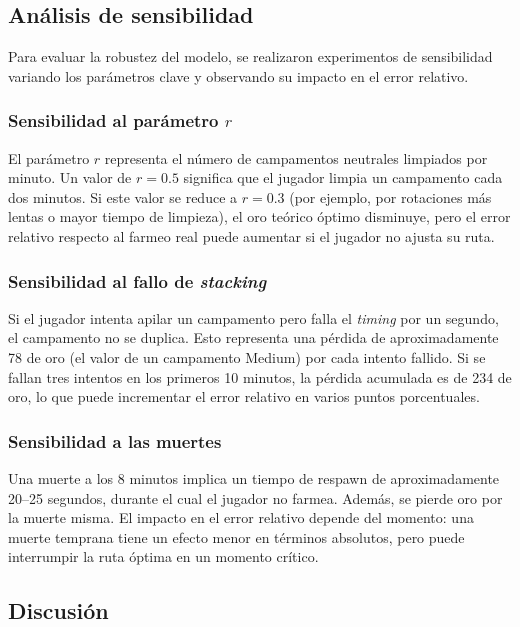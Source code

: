 \subsection{Análisis de sensibilidad}

Para evaluar la robustez del modelo, se realizaron experimentos de sensibilidad variando los parámetros clave y observando su impacto en el error relativo.

\subsubsection{Sensibilidad al parámetro \(r\)}

El parámetro \(r\) representa el número de campamentos neutrales limpiados por minuto. Un valor de \(r = 0.5\) significa que el jugador limpia un campamento cada dos minutos. Si este valor se reduce a \(r = 0.3\) (por ejemplo, por rotaciones más lentas o mayor tiempo de limpieza), el oro teórico óptimo disminuye, pero el error relativo respecto al farmeo real puede aumentar si el jugador no ajusta su ruta.

\subsubsection{Sensibilidad al fallo de \textit{stacking}}

Si el jugador intenta apilar un campamento pero falla el \textit{timing} por un segundo, el campamento no se duplica. Esto representa una pérdida de aproximadamente 78 de oro (el valor de un campamento Medium) por cada intento fallido. Si se fallan tres intentos en los primeros 10 minutos, la pérdida acumulada es de 234 de oro, lo que puede incrementar el error relativo en varios puntos porcentuales.

\subsubsection{Sensibilidad a las muertes}

Una muerte a los 8 minutos implica un tiempo de respawn de aproximadamente 20--25 segundos, durante el cual el jugador no farmea. Además, se pierde oro por la muerte misma. El impacto en el error relativo depende del momento: una muerte temprana tiene un efecto menor en términos absolutos, pero puede interrumpir la ruta óptima en un momento crítico.

\subsection{Discusión}

